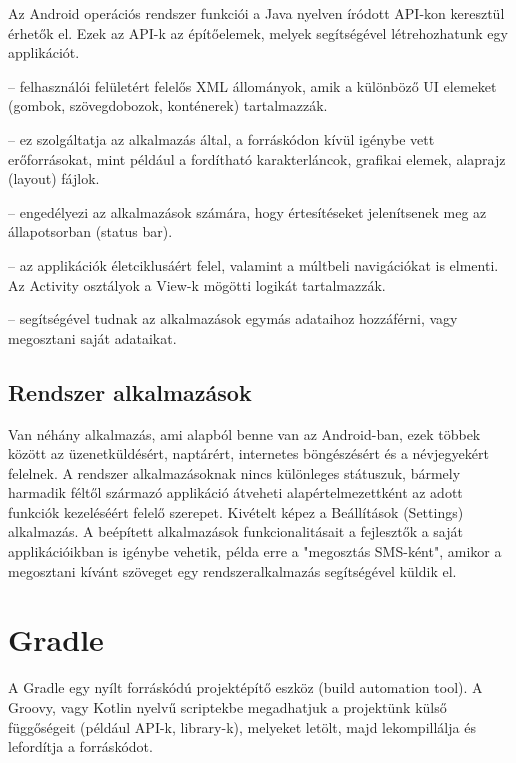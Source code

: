 Az Android operációs rendszer funkciói a Java nyelven íródott API-kon keresztül érhetők el. Ezek az API-k az építőelemek, melyek segítségével létrehozhatunk egy applikációt.

\begin{description}
	\setlength{\itemsep}{0.04mm}
	\item[View rendszer] -- felhasználói felületért felelős XML állományok, amik a különböző UI elemeket (gombok, szövegdobozok, konténerek) tartalmazzák.
	\item[Erőforráskezelő (Resource Manager)] -- ez szolgáltatja az alkalmazás által, a forráskódon kívül igénybe vett erőforrásokat, mint például a fordítható karakterláncok, grafikai elemek, alaprajz (layout) fájlok.
	\item[Értesítéskezelő (Notification Manager)] -- engedélyezi az alkalmazások számára, hogy értesítéseket jelenítsenek meg az állapotsorban (status bar).
	\item[Activity-kezelő] -- az applikációk életciklusáért felel, valamint a múltbeli navigációkat is elmenti. Az Activity osztályok a View-k mögötti logikát tartalmazzák.
	\item[Tartalom szolgáltató (Content Provider)] -- segítségével tudnak az alkalmazások egymás adataihoz hozzáférni, vagy megosztani saját adataikat.
\end{description}

\subsection{Rendszer alkalmazások}

Van néhány alkalmazás, ami alapból benne van az Android-ban, ezek többek között az üzenetküldésért, naptárért, internetes böngészésért és a névjegyekért felelnek. A rendszer alkalmazásoknak nincs különleges státuszuk, bármely harmadik féltől származó applikáció átveheti alapértelmezettként az adott funkciók kezeléséért felelő szerepet. Kivételt képez a Beállítások (Settings) alkalmazás. A beépített alkalmazások funkcionalitásait a fejlesztők a saját applikációikban is igénybe vehetik, példa erre a "megosztás SMS-ként", amikor a megosztani kívánt szöveget egy rendszeralkalmazás segítségével küldik el.


\section{Gradle}

A Gradle \cite{gradle} egy nyílt forráskódú projektépítő eszköz (build automation tool). A Groovy, vagy Kotlin nyelvű scriptekbe megadhatjuk a projektünk külső függőségeit (például API-k, library-k), melyeket letölt, majd lekompillálja és lefordítja a forráskódot.

